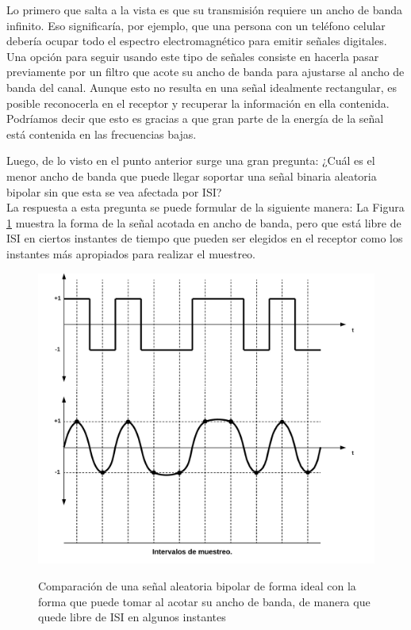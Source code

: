Lo primero que salta a la vista es que su transmisión requiere un ancho de banda infinito. Eso significaría, por ejemplo, que una persona con un teléfono celular debería ocupar todo el espectro electromagnético para emitir señales digitales. Una opción para seguir usando este tipo de señales consiste en hacerla pasar previamente por un filtro que acote su ancho de banda para ajustarse al ancho de banda del canal. Aunque esto no resulta en una señal idealmente rectangular, es posible reconocerla en el receptor y recuperar la información en ella contenida. Podríamos decir que esto es gracias a que gran parte de la energía de la señal está contenida en las frecuencias bajas. 

Luego, de lo visto en el punto anterior surge una gran pregunta: ¿Cuál es el menor ancho de banda que puede llegar soportar una señal binaria aleatoria bipolar sin que esta se vea afectada por ISI? \\

La respuesta a esta pregunta se puede formular de la siguiente manera: La Figura \ref{fig:Solucion} muestra la forma de la señal acotada en ancho de banda, pero que está libre de ISI en ciertos instantes de tiempo que pueden ser elegidos en el receptor como los instantes más apropiados para realizar el muestreo.

\vspace{400px}
\begin{figure}[h!]
	\captionsetup{justification = raggedright, singlelinecheck = false}
	\caption{Comparación de una señal aleatoria bipolar de forma ideal con la forma que puede tomar al acotar su ancho de banda, de manera que quede libre de ISI en algunos instantes} 
	\centering
	\includegraphics[scale=0.3]{Imagenes/Solucion.png}
	\label{fig:Solucion}
\end{figure}

